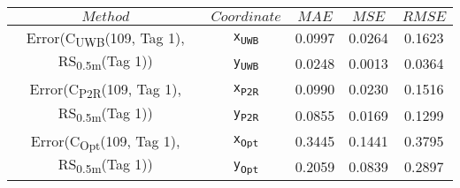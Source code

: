 \begin{table}[h]
\centering
\begin{tabular}{|c|c|c|c|c|}
\hline
$Method$ & $Coordinate$ & $MAE$ & $MSE$ & $RMSE$ \\
\hline
\multirow{2}{*}{{\footnotesize Error(C\textsubscript{UWB}(109, Tag 1), RS\textsubscript{0.5m}(Tag 1))}} & \texttt{x\textsubscript{UWB}} & 0.0997 & 0.0264 & 0.1623 \\
& \texttt{y\textsubscript{UWB}} & 0.0248 & 0.0013 & 0.0364 \\
\hline
\multirow{2}{*}{{\footnotesize Error(C\textsubscript{P2R}(109, Tag 1), RS\textsubscript{0.5m}(Tag 1))}} & \texttt{x\textsubscript{P2R}} & 0.0990 & 0.0230 & 0.1516 \\
& \texttt{y\textsubscript{P2R}} & 0.0855 & 0.0169 & 0.1299 \\
\hline
\multirow{2}{*}{{\footnotesize Error(C\textsubscript{Opt}(109, Tag 1), RS\textsubscript{0.5m}(Tag 1))}} & \texttt{x\textsubscript{Opt}} & 0.3445 & 0.1441 & 0.3795 \\
& \texttt{y\textsubscript{Opt}} & 0.2059 & 0.0839 & 0.2897 \\
\hline
\end{tabular}
\end{table}
